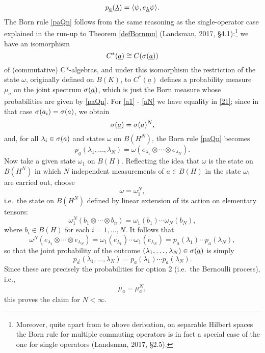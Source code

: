 \documentclass[11pt,a4paper]{article}
\numberwithin{equation}{section}
\newcommand{\er}{\eqref}
\newcommand{\beq}{\begin{equation}}
\newcommand{\eeq}{\end{equation}}
\newcommand{\ul}{\underline}
\newcommand{\ot}{\otimes}
\newcommand{\la}{\langle} \newcommand{\ra}{\rangle}
\newcommand{\Hs}{Hilbert space} \newcommand{\Bs}{Banach space}
\newcommand{\lm}{\lambda} \newcommand{\Lm}{\Lambda}
\newcommand{\om}{\omega} \newcommand{\Om}{\Omega}
\begin{document}
 \begin{equation}
p_{\ul{a}}(\ul{\lm})=\la\ps,e_{\ul{\lm}}\psi\ra.\label{paQnp}
\end{equation}
The  Born rule \er{paQn} follows from the same reasoning as the single-operator case explained in the run-up to Theorem \ref{defBornmu} (Landsman, 2017, \S 4.1):\footnote{Moreover, quite apart from te above derivation, on separable \Hs s the  Born rule for  multiple commuting operators is in fact a special case of the one for single operators  (Landsman, 2017, \S 2.5).}
we have an isomorphism
\begin{equation}
C^*(\ul{a})\cong C(\sg(\ul{a}))
\end{equation}
of (commutative) C*-algebras, and under this isomorphism the restriction of the state $\om$, originally defined on $B(K)$, to $C^*(\ul{a})$ defines a probability measure $\mu_{\ul{a}}$ on the joint spectrum $\sg(\ul{a})$, which is just the Born measure whose probabilities are given by \er{paQn}.
For  \er{a1} - \er{aN} we have equality in \er{21}; since in that case $\sigma(a_i)=\sigma(a)$,  we obtain
\begin{equation}
\sg(\ul{a})=\sg(a)^N,
\end{equation}
and, for all $\lm_i\in\sg(a)$ and states $\om$ on $B(H^N)$, 
 the Born rule \er{paQn} becomes 
 \begin{equation}
p_{\ul{a}}(\lm_1, \ldots, \lm_N)=\om(e_{\lm_1}\ot\cdots\ot e_{\lm_N}).
\end{equation}
Now take a given state $\om_1$ on $B(H)$. Reflecting the idea that $\om$ is the state on $B(H^N)$ in which $N$ independent measurements of $a\in B(H)$ in the state $\om_1$ are carried out,
choose
 \beq
 \om=\om_1^N,
 \eeq
 i.e.\  the state on $B(H^N)$ defined by linear extension of its action on elementary tensors:
\beq
\om_1^N(b_1\ot\cdots\ot b_n)=\om_1(b_1) \cdots \om_N(b_N),
\eeq
where $b_i\in B(H)$ for each $i=1, \ldots, N$.
It follows that
\begin{equation}
\om^N(e_{\lm_1}\ot\cdots\ot e_{\lm_N})=\om_1(e_{\lm_1})\cdots\om_1(e_{\lm_N})=p_a(\lm_1)\cdots p_a(\lm_N),
\end{equation}
so that the joint probability of the outcome $(\lm_1, \ldots, \lm_N)\in\sg(\ul{a})$ is simply
\begin{equation}
p_{\vec{a}}(\lm_1, \ldots, \lm_N)=p_a(\lm_1)\cdots p_a(\lm_N).
\end{equation}
Since these are precisely the probabilities for option 2 (i.e.\ the Bernoulli process), i.e.,
 \beq
 \mu_{\ul{a}}=\mu_a^N, \label{mulaN}
 \eeq
 this
 proves the claim for $N<\infty$.  
 
\end{document}
